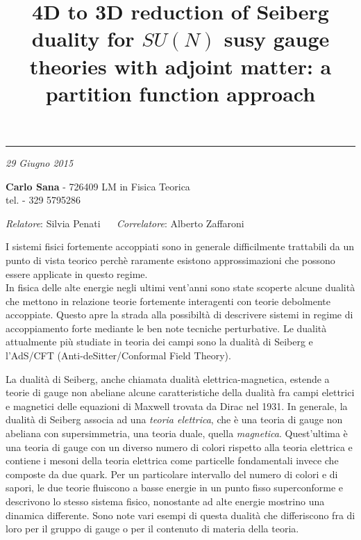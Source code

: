 \documentclass[a4paper,oneside,11pt]{article}
\date{}
\title{\boldmath \textbf{4D to 3D reduction of Seiberg duality for $SU(N)$ susy gauge theories with adjoint matter: a partition function approach }
 }
\author{}
\begin{document}
\maketitle
\vspace*{-2.3cm}

\begin{center}
\rule{\textwidth}{0.5pt}

\textit {29 Giugno 2015} \\
 \end{center}
\vspace{-0.3cm}
	 \textbf{Carlo Sana}  - \textsf{ 726409}  \hfill
 LM in Fisica Teorica 
\\
 \hspace{2cm} tel. \textsf{ - 329 5795286}\\
\vspace{-0.5cm}
\begin{center}
\textit{Relatore}: 
\textsf{Silvia Penati} 
~~
\textit{Correlatore}:
\textsf{Alberto Zaffaroni}

\end{center}

I sistemi fisici fortemente accoppiati sono in generale difficilmente trattabili da un punto di vista teorico perchè raramente esistono approssimazioni che possono essere applicate in questo regime.\\
In fisica delle alte energie negli ultimi vent'anni sono state scoperte alcune dualità che mettono in relazione teorie fortemente interagenti con teorie debolmente accoppiate.
Questo apre la strada alla possibiltà di descrivere sistemi in regime di accoppiamento forte mediante le ben note tecniche perturbative.
Le dualità attualmente più studiate in teoria dei campi sono la dualità di Seiberg e l'AdS/CFT (Anti-deSitter/Conformal Field Theory).

La dualità di Seiberg, anche chiamata dualità elettrica-magnetica, estende a teorie di gauge non abeliane alcune caratteristiche della dualità fra campi elettrici e magnetici delle equazioni di Maxwell trovata da Dirac nel 1931. 
In generale, la dualità di Seiberg associa ad una \emph{teoria elettrica}, che è una teoria di gauge non abeliana con supersimmetria, una teoria duale, quella \emph{magnetica}.
Quest'ultima è una teoria di gauge con un diverso numero di colori rispetto alla teoria elettrica e contiene i mesoni della teoria elettrica come particelle fondamentali invece che composte da due quark.
Per un particolare intervallo del numero di colori e di sapori, le due teorie fluiscono a basse energie in un punto fisso superconforme e descrivono lo stesso sistema fisico, nonostante ad alte energie mostrino una dinamica differente.
Sono note vari esempi di questa dualità che differiscono fra di loro per il gruppo di gauge o per il contenuto di materia della teoria.
\end{document}
